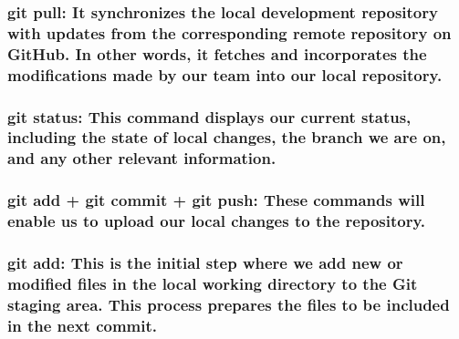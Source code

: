 \documentclass[
]{article}
\begin{document}
\subsubsection{\texorpdfstring{\textbf{git pull}: It synchronizes the
local development repository with updates from the corresponding remote
repository on GitHub. In other words, it fetches and incorporates the
modifications made by our team into our local
repository.}{git pull: It synchronizes the local development repository with updates from the corresponding remote repository on GitHub. In other words, it fetches and incorporates the modifications made by our team into our local repository.}}\label{git-pull-it-synchronizes-the-local-development-repository-with-updates-from-the-corresponding-remote-repository-on-github.-in-other-words-it-fetches-and-incorporates-the-modifications-made-by-our-team-into-our-local-repository.}

\subsubsection{\texorpdfstring{\textbf{git status}: This command
displays our current status, including the state of local changes, the
branch we are on, and any other relevant
information.}{git status: This command displays our current status, including the state of local changes, the branch we are on, and any other relevant information.}}\label{git-status-this-command-displays-our-current-status-including-the-state-of-local-changes-the-branch-we-are-on-and-any-other-relevant-information.}

\subsubsection{\texorpdfstring{\textbf{git add + git commit + git push}:
These commands will enable us to upload our local changes to the
repository.}{git add + git commit + git push: These commands will enable us to upload our local changes to the repository.}}\label{git-add-git-commit-git-push-these-commands-will-enable-us-to-upload-our-local-changes-to-the-repository.}

\subsubsection{\texorpdfstring{\textbf{git add}: This is the initial
step where we add new or modified files in the local working directory
to the Git staging area. This process prepares the files to be included
in the next
commit.}{git add: This is the initial step where we add new or modified files in the local working directory to the Git staging area. This process prepares the files to be included in the next commit.}}\label{git-add-this-is-the-initial-step-where-we-add-new-or-modified-files-in-the-local-working-directory-to-the-git-staging-area.-this-process-prepares-the-files-to-be-included-in-the-next-commit.}
\end{document}
